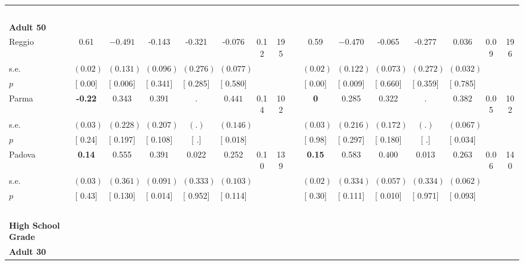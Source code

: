 \begin{longtable}{L{8em} c c c c c c c p{1em} c c c c c c c}
~\\[1em]
\quad \quad \textbf{Adult 50} & & & & & & & & & & & & & & & \\* 
\quad \quad \quad Reggio& 0.61 & $ \mathbf{   -0.491}$ &    -0.143 &    -0.321 &    -0.076 &      0.12 &       195 & & 0.59 & $ \mathbf{   -0.470}$ &    -0.065 &    -0.277 &     0.036 &      0.09 &       196  \\*
\quad \quad \quad \quad s.e.& $ (     0.02)$ & $ (    0.131)$ & $ (    0.096)$ & $ (    0.276)$ & $ (    0.077)$ & & & & $ (     0.02)$ & $ (    0.122)$ & $ (    0.073)$ & $ (    0.272)$ & $ (    0.032)$ & &  \\*
\quad \quad \quad \quad $ p$ & [     0.00] & [    0.006] & [    0.341] & [    0.285] & [    0.580] & & & & [     0.00] & [    0.009] & [    0.660] & [    0.359] & [    0.785] & &  \\[1em]
\quad \quad \quad Parma& \textbf{    -0.22} &     0.343 &     0.391 &         . & $ \mathbf{    0.441}$ &      0.14 &       102 & & \textbf{0} &     0.285 &     0.322 &         . & $ \mathbf{    0.382}$ &      0.05 &       102  \\*
\quad \quad \quad \quad s.e.& $ (     0.03)$ & $ (    0.228)$ & $ (    0.207)$ & $ (        .)$ & $ (    0.146)$ & & & & $ (     0.03)$ & $ (    0.216)$ & $ (    0.172)$ & $ (        .)$ & $ (    0.067)$ & &  \\*
\quad \quad \quad \quad $ p$ & [     0.24] & [    0.197] & [    0.108] & [        .] & [    0.018] & & & & [     0.98] & [    0.297] & [    0.180] & [        .] & [    0.034] & &  \\[1em]
\quad \quad \quad Padova& \textbf{     0.14} &     0.555 & $ \mathbf{    0.391}$ &     0.022 &     0.252 &      0.10 &       139 & & \textbf{     0.15} &     0.583 & $ \mathbf{    0.400}$ &     0.013 & $ \mathbf{    0.263}$ &      0.06 &       140  \\*
\quad \quad \quad \quad s.e.& $ (     0.03)$ & $ (    0.361)$ & $ (    0.091)$ & $ (    0.333)$ & $ (    0.103)$ & & & & $ (     0.02)$ & $ (    0.334)$ & $ (    0.057)$ & $ (    0.334)$ & $ (    0.062)$ & &  \\*
\quad \quad \quad \quad $ p$ & [     0.43] & [    0.130] & [    0.014] & [    0.952] & [    0.114] & & & & [     0.30] & [    0.111] & [    0.010] & [    0.971] & [    0.093] & &  \\[1em]
~\\[1em]
\textbf{High School Grade} \\*
\quad \quad \textbf{Adult 30} & & & & & & & & & & & & & & & \\* 

\end{longtable}
